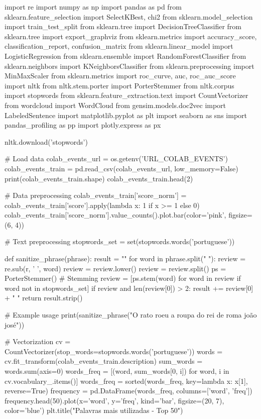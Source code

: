 \begin{codigo}[caption={Modelo de classificação supervisionada de sentimentos}, label={codigo:sentiment_classifier}, language=Python, breaklines=true]
  import re
  import numpy as np
  import pandas as pd
  from sklearn.feature_selection import SelectKBest, chi2
  from sklearn.model_selection import train_test_split
  from sklearn.tree import DecisionTreeClassifier
  from sklearn.tree import export_graphviz
  from sklearn.metrics import accuracy_score, classification_report, confusion_matrix
  from sklearn.linear_model import LogisticRegression
  from sklearn.ensemble import RandomForestClassifier
  from sklearn.neighbors import KNeighborsClassifier
  from sklearn.preprocessing import MinMaxScaler
  from sklearn.metrics import roc_curve, auc, roc_auc_score
  import nltk
  from nltk.stem.porter import PorterStemmer
  from nltk.corpus import stopwords
  from sklearn.feature_extraction.text import CountVectorizer
  from wordcloud import WordCloud
  from gensim.models.doc2vec import LabeledSentence
  import matplotlib.pyplot as plt
  import seaborn as sns
  import pandas_profiling as pp
  import plotly.express as px
  
  nltk.download('stopwords')
  
  # Load data
  colab_events_url = os.getenv('URL_COLAB_EVENTS')
  colab_events_train = pd.read_csv(colab_events_url, low_memory=False)
  print(colab_events_train.shape)
  colab_events_train.head(2)
  
  # Data preprocessing
  colab_events_train['score_norm'] = colab_events_train['score'].apply(lambda x: 1 if x >= 1 else 0)
  colab_events_train['score_norm'].value_counts().plot.bar(color='pink', figsize=(6, 4))
  
  # Text preprocessing
  stopwords_set = set(stopwords.words('portuguese'))
  
  def sanitize_phrase(phrase):
      result = ""
      for word in phrase.split(" "):
          review = re.sub(r, ' ', word)
          review = review.lower()
          review = review.split()
          ps = PorterStemmer()
          # Stemming
          review = [ps.stem(word) for word in review if word not in stopwords_set]
          if review and len(review[0]) > 2:
              result += review[0] + " "
      return result.strip()
  
  # Example usage
  print(sanitize_phrase("O rato roeu a roupa do rei de roma joão josé"))
  
  # Vectorization
  cv = CountVectorizer(stop_words=stopwords.words('portuguese'))
  words = cv.fit_transform(colab_events_train.description)
  sum_words = words.sum(axis=0)
  words_freq = [(word, sum_words[0, i]) for word, i in cv.vocabulary_.items()]
  words_freq = sorted(words_freq, key=lambda x: x[1], reverse=True)
  frequency = pd.DataFrame(words_freq, columns=['word', 'freq'])
  frequency.head(50).plot(x='word', y='freq', kind='bar', figsize=(20, 7), color='blue')
  plt.title("Palavras mais utilizadas - Top 50")
  

\end{codigo}
